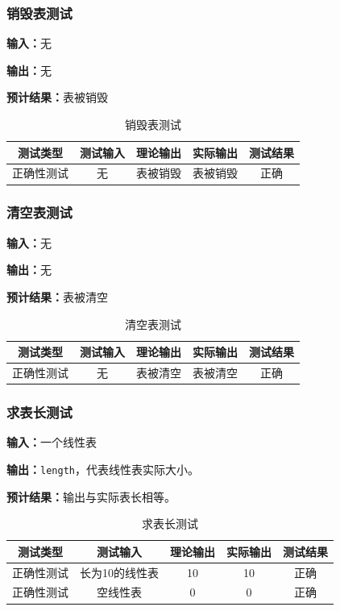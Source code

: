 \subsubsection{销毁表测试}
\textbf{输入：}无
\par
\textbf{输出：}无
\par
\textbf{预计结果：}表被销毁
\begin{table}[h]
\caption{销毁表测试}
\centering
\begin{tabular}{@{}ccccc@{}}
\toprule
\multicolumn{1}{c}{测试类型}    & \multicolumn{1}{c}{测试输入} & \multicolumn{1}{c}{理论输出} & \multicolumn{1}{c}{实际输出} & \multicolumn{1}{c}{测试结果} \\ \midrule
\multicolumn{1}{c|}{正确性测试}  & 无&表被销毁&表被销毁&正确\\ \bottomrule
\end{tabular}
\label{tab:destorytest1}
\end{table}

\subsubsection{清空表测试}
\textbf{输入：}无
\par
\textbf{输出：}无
\par
\textbf{预计结果：}表被清空
\begin{table}[h]
    \centering
    \caption{清空表测试}
    \begin{tabular}{@{}ccccc@{}}
        \toprule
        \multicolumn{1}{c}{测试类型}    & \multicolumn{1}{c}{测试输入} & \multicolumn{1}{c}{理论输出} & \multicolumn{1}{c}{实际输出} &
        \multicolumn{1}{c}{测试结果} \\ \midrule
        \multicolumn{1}{c|}{正确性测试}  &无 &表被清空&表被清空&正确\\ \bottomrule
    \end{tabular}
    \label{tab:cleartest1}
\end{table}


\subsubsection{求表长测试}
\textbf{输入：}一个线性表
\par
\textbf{输出：}\texttt{length}，代表线性表实际大小。
\par
\textbf{预计结果：}输出与实际表长相等。
\begin{table}[h]
    \centering
    \caption{求表长测试}
    \begin{tabular}{@{}ccccc@{}}
        \toprule
        \multicolumn{1}{c}{测试类型}    & \multicolumn{1}{c}{测试输入} & \multicolumn{1}{c}{理论输出} & \multicolumn{1}{c}{实际输出} &
        \multicolumn{1}{c}{测试结果} \\ \midrule
        \multicolumn{1}{c|}{正确性测试}  & 长为10的线性表&10&10&正确\\
        \multicolumn{1}{c|}{正确性测试}  & 空线性表&0&0&正确\\ \bottomrule
    \end{tabular}
    \label{tab:lengthtest1}
\end{table}


